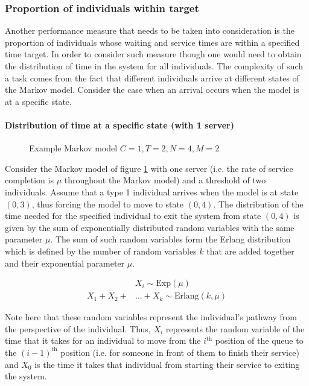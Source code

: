 \subsubsection{Proportion of individuals within target}

Another performance measure that needs to be taken into consideration is the
proportion of individuals whose waiting and service times are within a
specified time target.
In order to consider such measure though one would need to obtain the
distribution of time in the system for all individuals.
The complexity of such a task comes from the fact that different individuals
arrive at different states of the Markov model.
Consider the case when an arrival occurs when the model is at a specific state.

\paragraph{Distribution of time at a specific state (with 1 server)}

\begin{figure}[h]
    \centering
    \scalebox{0.75}{}
    \caption{Example Markov model \(C=1, T=2, N=4, M=2\)}
    \label{fig:distribution_of_time_at_specific_state_1_server}
\end{figure}

Consider the Markov model of figure
\ref{fig:distribution_of_time_at_specific_state_1_server} with one server (i.e.
the rate of service completion is \(\mu\) throughout the Markov model)
and a threshold of two individuals.
Assume that a type 1 individual arrives when the model is at state
\((0,3)\), thus forcing the model to move to state \((0,4)\).
The distribution of the time needed for the specified individual to exit the
system from state \((0,4)\) is given by the sum of exponentially distributed
random variables with the same parameter \(\mu\).
The sum of such random variables form the Erlang distribution which is defined
by the number of random variables \(k\) that are added together and their
exponential parameter \(\mu\).

\begin{align}
    & X_i \sim \text{Exp}(\mu) \nonumber \\
    X_1 + X_2 + & \dots + X_k \sim \text{Erlang}(k,\mu)
    \label{eq:erlang_distribution_definition}
\end{align}

Note here that these random variables represent the individual's pathway from
the perspective of the individual.
Thus, \(X_i\) represents the random variable of the time that it takes for an
individual to move from the \(i^{\text{th}}\) position of the queue to the
\((i-1)^{\text{th}}\) position (i.e. for someone in front of them to finish
their service) and \(X_0\) is the time it takes that individual from
starting their service to exiting the system.


